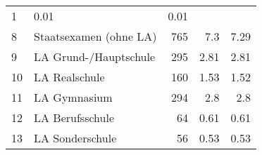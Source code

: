 \begin{longtable}{lXrrr}
       \num{1} &
       \num[round-mode=places,round-precision=2]{0,01} &
         \num[round-mode=places,round-precision=2]{0,01} \\

     8 &
     \multicolumn{1}{X}{ Staatsexamen (ohne LA)   } &


       \num{765} &
       \num[round-mode=places,round-precision=2]{7,3} &
         \num[round-mode=places,round-precision=2]{7,29} \\

     9 &
     \multicolumn{1}{X}{ LA Grund-/Hauptschule   } &


       \num{295} &
       \num[round-mode=places,round-precision=2]{2,81} &
         \num[round-mode=places,round-precision=2]{2,81} \\

     10 &
     \multicolumn{1}{X}{ LA Realschule   } &


       \num{160} &
       \num[round-mode=places,round-precision=2]{1,53} &
         \num[round-mode=places,round-precision=2]{1,52} \\

     11 &
     \multicolumn{1}{X}{ LA Gymnasium   } &


       \num{294} &
       \num[round-mode=places,round-precision=2]{2,8} &
         \num[round-mode=places,round-precision=2]{2,8} \\

     12 &
     \multicolumn{1}{X}{ LA Berufsschule   } &


       \num{64} &
       \num[round-mode=places,round-precision=2]{0,61} &
         \num[round-mode=places,round-precision=2]{0,61} \\

     13 &
     \multicolumn{1}{X}{ LA Sonderschule   } &


       \num{56} &
       \num[round-mode=places,round-precision=2]{0,53} &
         \num[round-mode=places,round-precision=2]{0,53} \\


\end{longtable}
